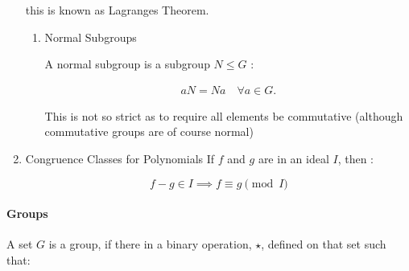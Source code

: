 \documentclass[a4paper,11pt,twoside]{article}
\begin{document}
\begin{enumerate}
this is known as Lagranges Theorem. \cite[\S 3.7]{gregoryleeAbstractAlgebra2018}


\begin{enumerate}
\item Normal Subgroups
\label{sec:org9dc7199}

A normal subgroup is a subgroup \(N \leq G\) :

\begin{align*}
      aN= Na \quad \forall a \in G
.\end{align*}

This is not so strict as to require all elements be commutative (although
commutative groups are of course normal)
\end{enumerate}

\item Congruence Classes for Polynomials
\label{sec:org2adce8d}
If \(f\) and \(g\) are in an ideal \(I\), then \cite[p. 240]{coxIdealsVarietiesAlgorithms1997}:

\[
       f-g \in I \implies f \equiv g \pmod{I}
       \]
\end{enumerate}
\paragraph{Groups}
\label{sec:org5e14bec}
A set \(G\) is a group, if there in a binary operation, \(\star\),
defined on that set such that:
\end{document}
